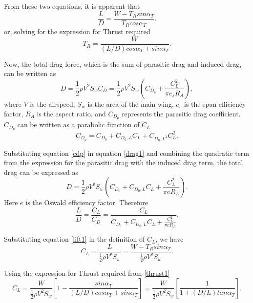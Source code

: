 \documentclass[letterpaper,12pt]{article}
\begin{document}
From these two equations, it is apparent that
\begin{equation}
\frac{L}{D}=\frac{W-T_Rsin\alpha_T}{T_Rcos\alpha_T}.
\end{equation}
or, solving for the expression for Thrust required
\begin{equation}
T_R=\frac{W}{(L/D)cos\alpha_T+sin\alpha_T}.
\label{thrust1}
\end{equation}

Now, the total drag force, which is the sum of parasitic drag and induced drag, can be written as
\begin{equation}
D=\frac{1}{2}\rho V^2S_wC_D = \frac{1}{2}\rho V^2 S_w\left(C_{D_p}+\frac{C_L^2}{\pi e_sR_A}\right),
\label{drag1}
\end{equation}
where $V$ is the airspeed, $S_w$ is the area of the main wing, $e_s$ is the span efficiency factor, $R_A$ is the aspect ratio, and $C_{D_p}$ represents the parasitic drag coefficient. $C_{D_p}$ can be written as a parabolic function of $C_L$
\begin{equation}
C_{D_p}=C_{D_0}+C_{{D_0},L}C_L+C_{{D_0},{L^2}}C_L^2.
\label{cdp}
\end{equation}

Substituting equation \ref{cdp} in equation \ref{drag1} and combining the quadratic term from the expression for the parasitic drag with the induced drag term, the total drag can be expressed as
\begin{equation}
D=\frac{1}{2}\rho V^2S_w\left(C_{D_0}+C_{{D_0},L}C_L+\frac{C_L^2}{\pi eR_A}\right).
\label{drag2}
\end{equation}
Here $e$ is the Oswald efficiency factor. Therefore
\begin{equation}
\boxed{
\frac{L}{D}=\frac{C_L}{C_D}=\frac{C_L}{C_{D_0}+C_{{D_0},L}C_L+\frac{C_L^2}{\pi eR_A}}.
}
\label{LDratio}
\end{equation}

Substituting equation \ref{lift1} in the definition of $C_L$, we have
\begin{equation}
C_L=\frac{L}{\frac{1}{2}\rho V^2S_w}=\frac{W-T_R sin\alpha_T}{\frac{1}{2}\rho V^2S_w}.
\end{equation}

Using the expression for Thrust required from \ref{thrust1}
\begin{equation}
\boxed{
C_L=\frac{W}{\frac{1}{2}\rho V^2S_w}\left[1-\frac{sin\alpha_T}{(L/D)cos\alpha_T+sin\alpha_T}\right]=\frac{W}{\frac{1}{2}\rho V^2S_w}\left[\frac{1}{1+(D/L)tan\alpha_T}\right].
}
\label{cl1}
\end{equation}
\end{document}
